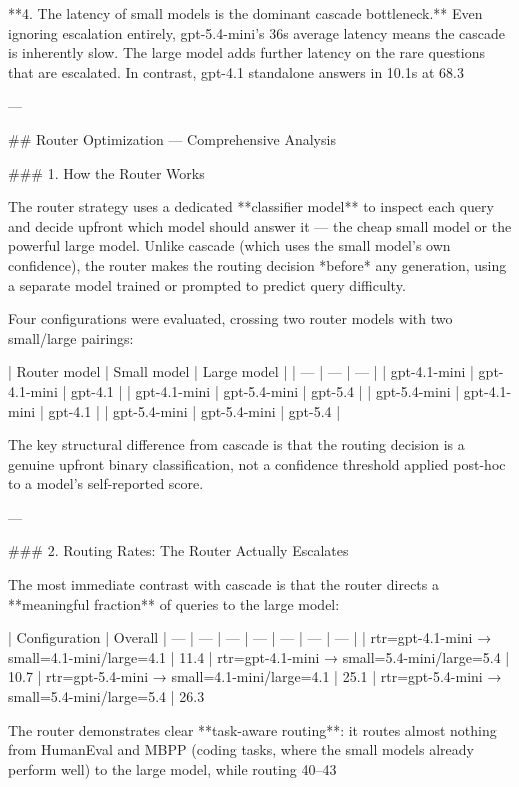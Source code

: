 **4. The latency of small models is the dominant cascade bottleneck.** Even ignoring escalation entirely, gpt-5.4-mini's 36s average latency means the cascade is inherently slow. The large model adds further latency on the rare questions that are escalated. In contrast, gpt-4.1 standalone answers in 10.1s at 68.3%

---

## Router Optimization — Comprehensive Analysis

### 1. How the Router Works

The router strategy uses a dedicated **classifier model** to inspect each query and decide upfront which model should answer it — the cheap small model or the powerful large model. Unlike cascade (which uses the small model's own confidence), the router makes the routing decision *before* any generation, using a separate model trained or prompted to predict query difficulty.

Four configurations were evaluated, crossing two router models with two small/large pairings:

| Router model | Small model | Large model |
| --- | --- | --- |
| gpt-4.1-mini | gpt-4.1-mini | gpt-4.1 |
| gpt-4.1-mini | gpt-5.4-mini | gpt-5.4 |
| gpt-5.4-mini | gpt-4.1-mini | gpt-4.1 |
| gpt-5.4-mini | gpt-5.4-mini | gpt-5.4 |

The key structural difference from cascade is that the routing decision is a genuine upfront binary classification, not a confidence threshold applied post-hoc to a model's self-reported score.

---

### 2. Routing Rates: The Router Actually Escalates

The most immediate contrast with cascade is that the router directs a **meaningful fraction** of queries to the large model:

| Configuration | Overall %
| --- | --- | --- | --- | --- | --- | --- |
| rtr=gpt-4.1-mini → small=4.1-mini/large=4.1 | 11.4%
| rtr=gpt-4.1-mini → small=5.4-mini/large=5.4 | 10.7%
| rtr=gpt-5.4-mini → small=4.1-mini/large=4.1 | 25.1%
| rtr=gpt-5.4-mini → small=5.4-mini/large=5.4 | 26.3%

The router demonstrates clear **task-aware routing**: it routes almost nothing from HumanEval and MBPP (coding tasks, where the small models already perform well) to the large model, while routing 40–43%

